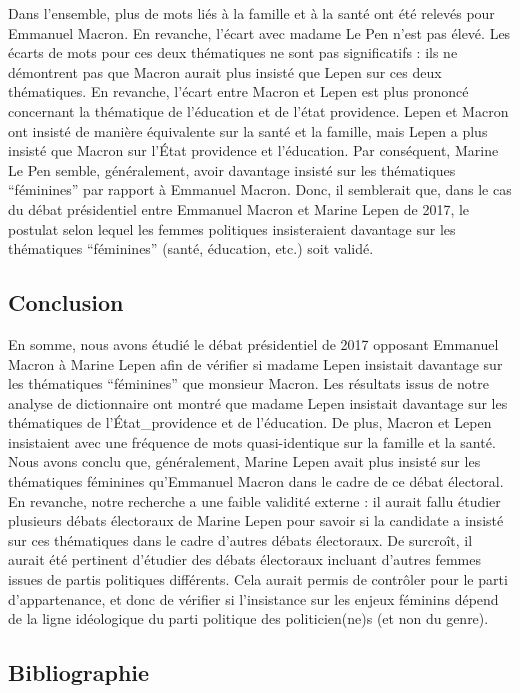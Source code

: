 \documentclass[
  letterpaper,
  DIV=11,
  numbers=noendperiod]{scrartcl}
\begin{document}
Dans l'ensemble, plus de mots liés à la famille et à la santé ont été
relevés pour Emmanuel Macron. En revanche, l'écart avec madame Le Pen
n'est pas élevé. Les écarts de mots pour ces deux thématiques ne sont
pas significatifs : ils ne démontrent pas que Macron aurait plus insisté
que Lepen sur ces deux thématiques. En revanche, l'écart entre Macron et
Lepen est plus prononcé concernant la thématique de l'éducation et de
l'état providence. Lepen et Macron ont insisté de manière équivalente
sur la santé et la famille, mais Lepen a plus insisté que Macron sur
l'État providence et l'éducation. Par conséquent, Marine Le Pen semble,
généralement, avoir davantage insisté sur les thématiques ``féminines''
par rapport à Emmanuel Macron. Donc, il semblerait que, dans le cas du
débat présidentiel entre Emmanuel Macron et Marine Lepen de 2017, le
postulat selon lequel les femmes politiques insisteraient davantage sur
les thématiques ``féminines'' (santé, éducation, etc.) soit validé.

\hypertarget{conclusion}{%
\subsection{Conclusion}\label{conclusion}}

En somme, nous avons étudié le débat présidentiel de 2017 opposant
Emmanuel Macron à Marine Lepen afin de vérifier si madame Lepen
insistait davantage sur les thématiques ``féminines'' que monsieur
Macron. Les résultats issus de notre analyse de dictionnaire ont montré
que madame Lepen insistait davantage sur les thématiques de
l'État\_providence et de l'éducation. De plus, Macron et Lepen
insistaient avec une fréquence de mots quasi-identique sur la famille et
la santé. Nous avons conclu que, généralement, Marine Lepen avait plus
insisté sur les thématiques féminines qu'Emmanuel Macron dans le cadre
de ce débat électoral. En revanche, notre recherche a une faible
validité externe : il aurait fallu étudier plusieurs débats électoraux
de Marine Lepen pour savoir si la candidate a insisté sur ces
thématiques dans le cadre d'autres débats électoraux. De surcroît, il
aurait été pertinent d'étudier des débats électoraux incluant d'autres
femmes issues de partis politiques différents. Cela aurait permis de
contrôler pour le parti d'appartenance, et donc de vérifier si
l'insistance sur les enjeux féminins dépend de la ligne idéologique du
parti politique des politicien(ne)s (et non du genre).

\hypertarget{bibliographie}{%
\subsection{Bibliographie}\label{bibliographie}}
\end{document}
